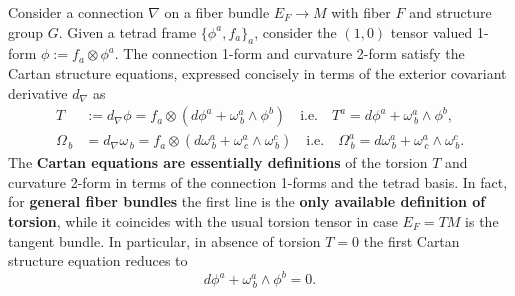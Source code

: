 \documentclass[../geometry_main.tex]{subfiles}
\begin{document}
\begin{mytheorem}
%
Consider a connection $\nabla$ on a fiber bundle $E_F \to M$ with fiber $F$ and structure group $G$.
Given a tetrad frame $\{\phi^a,f_a\}_a$, consider the $(1,0)$ tensor valued 1-form $\phi :=  f_a \otimes \phi^a$.
The connection 1-form and curvature 2-form satisfy the Cartan structure equations, expressed concisely in terms of the exterior covariant derivative $d_\nabla$ as
\begin{align}
    T &:= d_\nabla \phi = f_a \otimes \left(d \phi^a + \omega^a_{\, b} \wedge \phi^b \right) 
    \quad \text{i.e.} \quad T^a = d \phi^a + \omega^a_{\, b} \wedge \phi^b,
    \\
    \Omega_{\, b} &= d_\nabla \omega_{\, b} = f_a \otimes \left(d \omega^a_{\, b} + \omega^a_{\,c} \wedge \omega^c_{\, b}\right) 
    \quad\text{i.e.} \quad \Omega^a_{\, b} = d \omega^a_{\, b} + \omega^a_{\, c} \wedge \omega^c_{\, b}.
\end{align}
The \textbf{Cartan equations are essentially definitions} of the torsion $T$ and curvature 2-form in terms of the connection 1-forms and the tetrad basis.
In fact, for \textbf{general fiber bundles} the first line is the \textbf{only available definition of torsion}, while it coincides with the usual torsion tensor in case $E_F = TM$ is the tangent bundle.
In particular, in absence of torsion $T=0$ the first Cartan structure equation reduces to
\begin{equation}
    d \phi^a + \omega^a_{\, b} \wedge \phi^b = 0.
\end{equation}
\end{mytheorem}
\vspace{-3mm}
\end{document}

